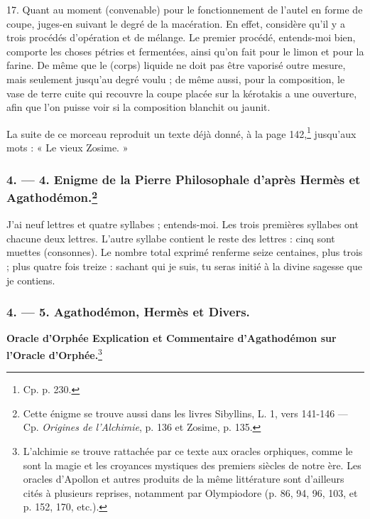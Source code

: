 \documentclass[a4paper, 11pt, oneside, polutonikogreek, french]{article}
\begin{document}
17. Quant au moment (convenable) pour le fonctionnement de l'autel en forme de coupe, juges-en suivant le degré de la macération. En effet, considère qu'il y a trois procédés d'opération et de mélange. Le premier procédé, entends-moi bien, comporte les choses pétries et fermentées, ainsi qu'on fait pour le limon et pour la farine. De même que le (corps) liquide ne doit pas être vaporisé outre mesure, mais seulement jusqu'au degré voulu ; de même aussi, pour la composition, le vase de terre cuite qui recouvre la coupe placée sur la kérotakis a une ouverture, afin que l'on puisse voir si la composition blanchit ou jaunit.

La suite de ce morceau reproduit un texte déjà donné, à la page 142,\footnote{Cp. p. 230.} jusqu'aux mots : « Le vieux Zosime. »

\bigskip
\centerline{\EightStarTaper}
\centerline{\EightStarTaper\EightStarTaper}
\bigskip

\subsubsection[4. --- 4. Enigme de la Pierre Philosophale d'après Hermès et Agathodémon.]{4. --- 4. Enigme de la Pierre Philosophale d'après Hermès et Agathodémon.\footnote{Cette énigme se trouve aussi dans les livres Sibyllins, L. 1, vers 141-146 --- Cp. \emph{Origines de l'Alchimie}, p. 136 et Zosime, p. 135.}}

J'ai neuf lettres et quatre syllabes ; entends-moi. Les trois premières syllabes ont chacune deux lettres. L'autre syllabe contient le reste des lettres : cinq sont muettes (consonnes). Le nombre total exprimé renferme seize centaines, plus trois ; plus quatre fois treize : sachant qui je suis, tu seras initié à la divine sagesse que je contiens.

\bigskip
\centerline{\EightStarTaper}
\centerline{\EightStarTaper\EightStarTaper}
\bigskip

\subsubsection{4. --- 5. Agathodémon, Hermès et Divers.}

\textbf{Oracle d'Orphée Explication et Commentaire d'Agathodémon sur l'Oracle d'Orphée.}\footnote{L'alchimie se trouve rattachée par ce texte aux oracles orphiques, comme le sont la magie et les croyances mystiques des premiers siècles de notre ère. Les oracles d'Apollon et autres produits de la même littérature sont d'ailleurs cités à plusieurs reprises, notamment par Olympiodore (p. 86, 94, 96, 103, et p. 152, 170, etc.).  }
\end{document}
